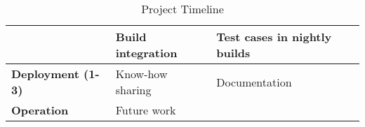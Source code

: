 \begin{table}[h]
\begin{tabular}{|l||l|l|}
                                         & Build integration                                                              & Test cases in nightly builds                                                  \\ \hline
    \textbf{Deployment (1-3)}            & Know-how sharing                                                               & Documentation                                                                 \\ \hline
    \textbf{Operation}                   & Future work                                                                    &                                                                               \\ \hline
    \end{tabular}
    
    \caption{Project Timeline}
    \label{Tab:projectTimeline}
\end{table}